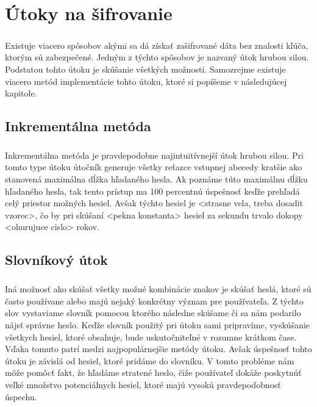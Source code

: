 \chapter{Útoky na šifrovanie}
\paragraph{}
Existuje viacero spôsobov akými sa dá získať zašifrované dáta bez znalosti kľúča, ktorým sú zabezpečené. Jedným z týchto spôsobov je nazvaný útok hrubou silou. Podstatou tohto útoku je skúšanie všetkých možností. Samozrejme existuje viacero metód implementácie tohto útoku, ktoré si popíšeme v následujúcej kapitole.

\section{Inkrementálna metóda}
\paragraph{}
Inkrementálna metóda je pravdepodobne najintuitívnejší útok hrubou silou. Pri tomto type útoku útočník generuje všetky reťazce vstupnej abecedy kratšie ako stanovená maximálna dĺžka hľadaného hesla. Ak poznáme túto maximálnu dĺžku hľadaného hesla, tak tento prístup ma 100 percentnú úspešnosť keďže prehľadá celý priestor možných hesiel. Avšak týchto hesiel je <strasne vela, treba dosadit vzorec>, čo by pri skúšaní <pekna konstanta> hesiel za sekundu trvalo dokopy <ohurujuce cislo> rokov.

\section{Slovníkový útok}
\paragraph{}
Iná možnosť ako skúšať všetky možné kombinácie znakov je skúšať heslá, ktoré sú často používane alebo majú nejaký konkrétny význam pre používateľa. Z týchto slov vystaviame slovník pomocou ktorého následne skúšame či sa nám podarilo nájsť správne heslo. Keďže slovník použitý pri útoku sami pripravíme, vyskúšanie všetkych hesiel, ktoré obsahuje, bude uskutočniteľné v rozumne krátkom čase. Vďaka tomuto patrí medzi najpopulárnejšie metódy útoku. Avšak úspešnosť tohto útoku je závislá od hesiel, ktoré pridáme do slovníku. V tomto probléme nám môže pomôcť fakt, že hľadáme stratené heslo, čiže používateľ dokáže poskytnúť veľké množstvo potenciálnych hesiel, ktoré majú vysokú pravdepodobnosť úspechu. 

